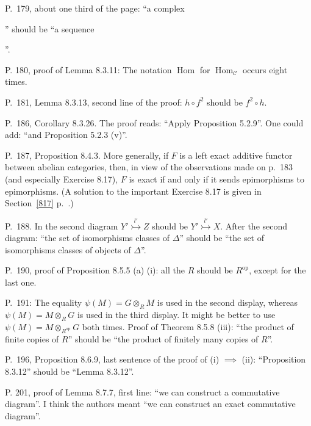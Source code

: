 \documentclass[12pt]{article}
\theoremstyle{remark}
\theoremstyle{definition}
\newcommand{\C}{\mathcal C}
\DeclareMathOperator{\Hom}{Hom}%
\DeclareMathOperator{\op}{op}
\begin{document}
\noindent P.~179, about one third of the page: ``a complex 
'' 
should be ``a sequence 
''.

\noindent P. 180, proof of Lemma 8.3.11: The notation $\Hom$ for $\Hom_\C$ occurs eight times. 

\noindent P.~181, Lemma 8.3.13, second line of the proof: $h\circ f^2$ should be $f^2\circ h$. 

\noindent P.~186, Corollary 8.3.26. The proof reads: ``Apply Proposition 5.2.9''. One could add: ``and Proposition 5.2.3 (v)''. 

\noindent P.~187, Proposition 8.4.3. More generally, if $F$ is a left exact additive functor between abelian categories, then, in view of the observations made on p.~183 (and especially Exercise 8.17), $F$ is exact if and only if it sends epimorphisms to epimorphisms. (A solution to the important Exercise 8.17 is given in Section~\ref{817} p.~\pageref{817}.) 

\noindent P.~188. In the second diagram $Y'\overset{l'}{\rightarrowtail}Z$ should be $Y'\overset{l'}{\rightarrowtail}X$. After the second diagram: ``the set of isomorphisms classes of $\Delta$'' should be ``the set of isomorphisms classes of objects of $\Delta$''.

\noindent P.~190, proof of Proposition 8.5.5 (a) (i): all the $R$ should be $R^{\op}$, except for the last one.

\noindent P.~191: The equality $\psi(M)=G\otimes_RM$ is used in the second display, whereas $\psi(M)=M\otimes_RG$ is used in the third display. It might be better to use $\psi(M)=M\otimes_{R^{\op}}G$ both times. Proof of Theorem 8.5.8 (iii): ``the product of finite copies of $R$'' should be ``the product of finitely many copies of $R$''.

\noindent P.~196, Proposition 8.6.9, last sentence of the proof of (i) $\implies$ (ii): ``Proposition 8.3.12'' should be ``Lemma 8.3.12''.


\noindent P. 201, proof of Lemma 8.7.7, first line: ``we can construct a commutative diagram''. I think the authors meant ``we can construct an exact commutative diagram''.
\end{document}
